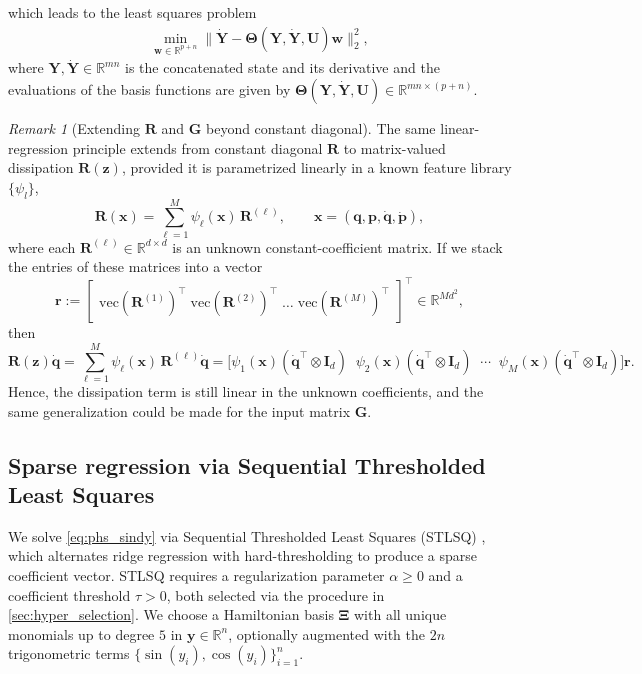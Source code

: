 \documentclass[11pt, a4paper]{article}
\theoremstyle{plain}
\theoremstyle{definition}
\theoremstyle{remark}
\newtheorem{remark}[theorem]{Remark}
\begin{document}
which leads to the least squares problem
\begin{align}
\min_{\mathbf{w}\in \mathbb R^{p+n}} \| \dot{\mathbf{Y}} - \boldsymbol{\Theta}(\mathbf{Y},\dot{\mathbf{Y}}, \mathbf{U}) \mathbf{w} \|_2^2,
\label{eq:phs_sindy}
\end{align}
where $\mathbf{Y},\dot{\mathbf{Y}} \in \mathbb R^{mn}$ is the concatenated state and its derivative and the evaluations of the basis functions are given by $\boldsymbol{\Theta}(\mathbf{Y},\dot{\mathbf{Y}}, \mathbf{U}) \in \mathbb R^{mn \times (p + n)}$.

\begin{remark}[Extending $\mathbf{R}$ and $\mathbf{G}$ beyond constant diagonal]
The same linear-regression principle extends from constant diagonal \(\mathbf{R}\) to matrix-valued dissipation \(\mathbf{R}(\mathbf{z})\), provided it is parametrized linearly in a known feature library $\{\psi_l\}$,
\[
\mathbf{R}(\mathbf{x})=\sum_{\ell=1}^M \psi_\ell(\mathbf{x})\,\mathbf{R}^{(\ell)},
\qquad \mathbf{x}=(\mathbf{q},\mathbf{p},\dot{\mathbf{q}},\dot{\mathbf{p}}),
\]
where each \(\mathbf{R}^{(\ell)}\in\mathbb R^{d\times d}\) is an unknown constant-coefficient matrix. If we stack the entries of these matrices into a vector
\[
\mathbf{r}
:=
\begin{bmatrix}
\mathrm{vec}(\mathbf{R}^{(1)})^\top\;
\mathrm{vec}(\mathbf{R}^{(2)})^\top\;
\dots \;
\mathrm{vec}(\mathbf{R}^{(M)})^\top
\end{bmatrix}^\top
\in\mathbb R^{Md^2},
\]
then
\[
\mathbf{R}(\mathbf{z})\dot{\mathbf{q}}
=
\sum_{\ell=1}^M \psi_\ell(\mathbf{x})\,\mathbf{R}^{(\ell)}\dot{\mathbf{q}}
=
\Big[
\psi_1(\mathbf{x})(\dot{\mathbf{q}}^\top\otimes \mathbf{I}_d)\;\;
\psi_2(\mathbf{x})(\dot{\mathbf{q}}^\top\otimes \mathbf{I}_d)\;\;
\cdots\;\;
\psi_M(\mathbf{x})(\dot{\mathbf{q}}^\top\otimes \mathbf{I}_d)
\Big]\mathbf{r}.
\]
Hence, the dissipation term is still linear in the unknown coefficients, and the same generalization could be made for the input matrix $\mathbf{G}$.
\end{remark}


\subsection{Sparse regression via Sequential Thresholded Least Squares}

We solve \eqref{eq:phs_sindy} via Sequential Thresholded Least Squares (STLSQ) \cite{brunton_discovering_2016,de2020pysindy,zhang2019convergence}, which alternates ridge regression with hard-thresholding to produce a sparse coefficient vector. STLSQ requires a regularization parameter $\alpha \geq 0$ and a coefficient threshold $\tau > 0$, both selected via the procedure in \cref{sec:hyper_selection}. We choose a Hamiltonian basis $\boldsymbol{\Xi}$ with all unique monomials up to degree $5$ in $\mathbf{y} \in \mathbb R^n$, optionally augmented with the $2n$ trigonometric terms $\{\sin(y_i), \cos(y_i)\}_{i=1}^n$.
\end{document}
